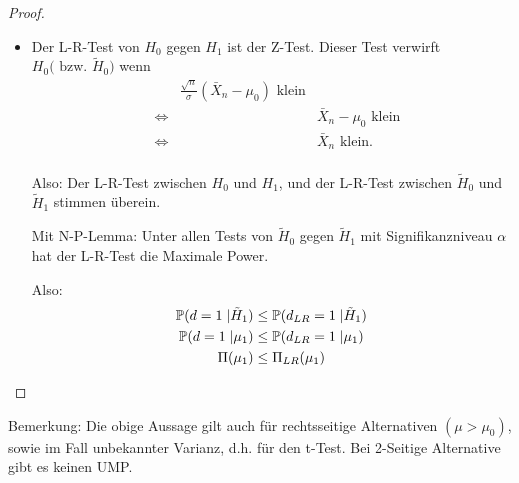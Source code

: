 \documentclass{tstextbook}
\begin{document}
\begin{proof}
\begin{itemize}
		\item Der L-R-Test von $H_0$ gegen $H_1$ ist der Z-Test. Dieser Test verwirft $H_0 \text{(  bzw. } \tilde{H}_0 ) $ wenn
		\[
		\begin{aligned}
			&& \frac{\sqrt{n}}{\sigma}(\bar{X}_n-\mu_0) \text{ klein} \\
			& \Leftrightarrow && \bar{X}_n-\mu_0 \text{ klein} \\
			& \Leftrightarrow && \bar{X}_n \text{ klein.}\\
		\end{aligned}
		\]
		
		Also: Der L-R-Test zwischen $H_0$ und $H_1$, und der L-R-Test zwischen $\tilde{H}_0$ und $\tilde{H}_1$ stimmen überein.
		
		Mit N-P-Lemma: Unter allen Tests von $\tilde{H}_0$ gegen $\tilde{H}_1$ mit Signifikanzniveau $\alpha$ hat der L-R-Test die Maximale Power.
		
		Also:
		\[
		\begin{aligned}
			\mathbb P(d=1\;|\tilde{H}_1) & \le \mathbb P(d_{LR}=1\;|\tilde{H}_1) \\
			 \mathbb P(d=1\;| \mu_1) & \le \mathbb P(d_{LR}=1\;| \mu_1)\\
			 \Pi(\mu_1)  & \le  \Pi_{LR} (\mu_1)  	
		\end{aligned}
		\]
	\end{itemize}

\end{proof}

\begin{remark}
	Bemerkung: Die obige Aussage gilt auch für rechtsseitige Alternativen $ (\mu>\mu_0) $, sowie im Fall unbekannter Varianz, d.h. für den t-Test. Bei 2-Seitige Alternative gibt es keinen UMP.
\end{remark}
\end{document}
